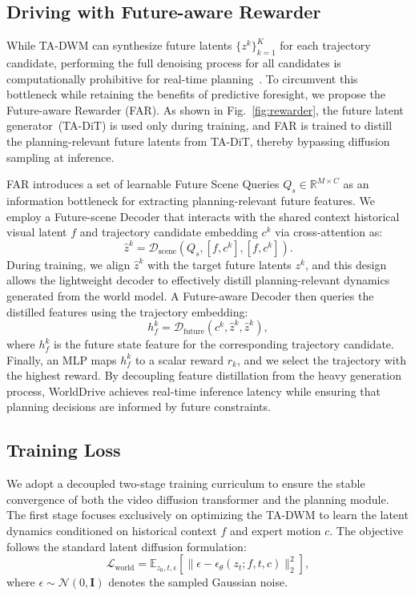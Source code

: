 \subsection{Driving with Future-aware Rewarder}

While TA-DWM can synthesize future latents $\{z^k\}_{k=1}^K$ for each trajectory candidate, performing the full denoising process for all candidates is computationally prohibitive for real-time planning~\cite{drivewm, zeng2025fsdrive}. To circumvent this bottleneck while retaining the benefits of predictive foresight, we propose the Future-aware Rewarder (FAR). As shown in Fig.~\ref{fig:rewarder}, the future latent generator~(TA-DiT) is used only during training, and FAR is trained to distill the planning-relevant future latents from TA-DiT, thereby bypassing diffusion sampling at inference.

FAR introduces a set of learnable Future Scene Queries $Q_{s} \in \mathbb{R}^{M \times C}$ as an information bottleneck for extracting planning-relevant future features. We employ a Future-scene Decoder that interacts with the shared context historical visual latent $f$ and trajectory candidate embedding $c^k$ via cross-attention as:
\begin{equation}
    \hat{z}^k = \mathcal{D}_{\text{scene}}(Q_{s}, [f, c^k], [f, c^k]).
\end{equation}
During training, we align  $\hat{z}^k$ with the target future latents $ z^k $, and this design allows the lightweight decoder to effectively distill planning-relevant dynamics generated from the world model. A Future-aware Decoder then queries the distilled features using the trajectory embedding:
\begin{equation}
    h_{f}^k = \mathcal{D}_{\text{future}}(c^k, \hat{z}^k, \hat{z}^k),
\end{equation}
where $h_{f}^k$ is the future state feature for the corresponding trajectory candidate.
Finally, an MLP maps $h_{f}^k$ to a scalar reward $r_k$, and we select the trajectory with the highest reward. By decoupling feature distillation from the heavy generation process, WorldDrive achieves real-time inference latency while ensuring that planning decisions are informed by future constraints.

\subsection{Training Loss}

We adopt a decoupled two-stage training curriculum to ensure the stable convergence of both the video diffusion transformer and the planning module. The first stage focuses exclusively on optimizing the TA-DWM to learn the latent dynamics conditioned on historical context $f$ and expert motion $c$. The objective follows the standard latent diffusion formulation:
\begin{equation}
    \mathcal{L}_{\text{world}} = \mathbb{E}_{z_0, t, \epsilon} \left[ \| {\epsilon} - \epsilon_\theta(z_t; f, t, c) \|^2_2 \right],
\end{equation}
where $\epsilon \sim \mathcal{N}(0, \mathbf{I})$ denotes the sampled Gaussian noise. 

